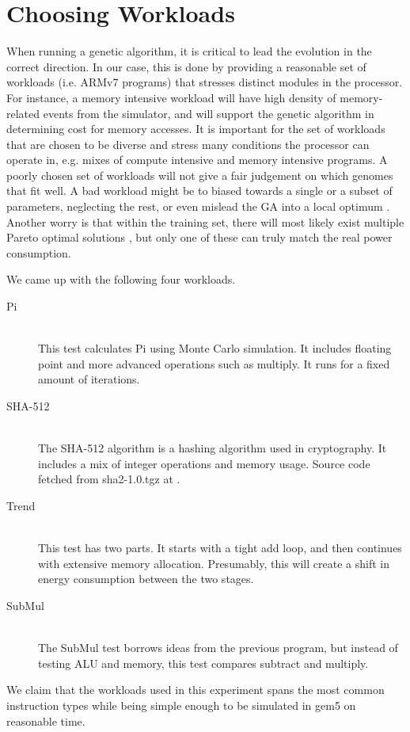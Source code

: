 \section{Choosing Workloads}
\label{sec:workloads}

When running a genetic algorithm, it is critical to lead the evolution in the
correct direction. In our case, this is done by providing a reasonable set of
workloads (i.e. ARMv7 programs) that stresses distinct modules in the processor.
For instance, a memory intensive workload will have high density of
memory-related events from the simulator, and will support the genetic algorithm
in determining cost for memory accesses. It is important for the set of
workloads that are chosen to be diverse and stress many conditions the processor
can operate in, e.g. mixes of compute intensive and memory intensive programs. A
poorly chosen set of workloads will not give a fair judgement on which genomes
that fit well. A bad workload might be to biased towards a single or a subset of
parameters, neglecting the rest, or even mislead the GA into a local optimum
\cite{introtoga}. Another worry is that within the training set, there will most
likely exist multiple Pareto optimal solutions \cite{deb2014multi}, but only one
of these can truly match the real power consumption.

We came up with the following four workloads.

\begin{description}
    \item[Pi] \hfill \\
        This test calculates Pi using Monte Carlo simulation. It includes
        floating point and more advanced operations such as multiply. It runs
        for a fixed amount of iterations.
    \item[SHA-512] \hfill \\
        The SHA-512 algorithm is a hashing algorithm used in cryptography. It
        includes a mix of integer operations and memory usage. Source code
        fetched from sha2-1.0.tgz at \cite{sha2}.
    \item[Trend] \hfill \\
        This test has two parts. It starts with a tight add loop, and then
        continues with extensive memory allocation. Presumably, this will create
        a shift in energy consumption between the two stages.
    \item[SubMul] \hfill \\
        The SubMul test borrows ideas from the previous program, but instead of
        testing ALU and memory, this test compares subtract and multiply.
\end{description}

We claim that the workloads used in this experiment spans the most common
instruction types while being simple enough to be simulated in gem5 on
reasonable time.

